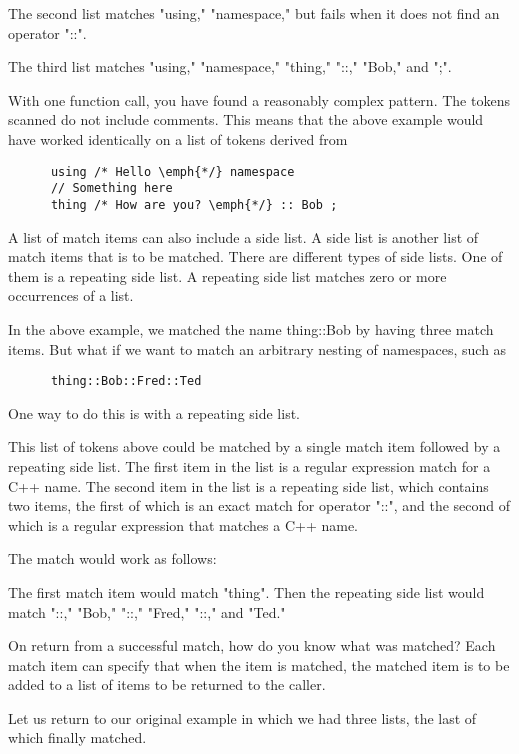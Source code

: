 The second list matches "using," "namespace," but fails when it does not find
an operator "::".

The third list matches "using," "namespace," "thing," "::," "Bob," and ";".

With one function call, you have found a reasonably complex pattern.  The
tokens scanned do not include comments.  This means that the above example
would have worked identically on a list of tokens derived from

\small{\begin{verbatim}
      using /* Hello \emph{*/} namespace
      // Something here
      thing /* How are you? \emph{*/} :: Bob ;
\end{verbatim}}

A list of match items can also include a side list.  A side list is another
list of match items that is to be matched.  There are different types of side
lists.  One of them is a repeating side list.  A repeating side list matches
zero or more occurrences of a list.

In the above example, we matched the name thing::Bob by having three match
items.  But what if we want to match an arbitrary nesting of namespaces, such
as

\small{\begin{verbatim}
      thing::Bob::Fred::Ted
\end{verbatim}}

One way to do this is with a repeating side list.

This list of tokens above could be matched by a single match item followed by
a repeating side list.  The first item in the list is a regular expression
match for a C++ name.  The second item in the list is a repeating side list,
which contains two items, the first of which is an exact match for operator
"::", and the second of which is a regular expression that matches a C++
name.

The match would work as follows:

The first match item would match "thing".  Then the repeating side list would
match "::," "Bob," "::," "Fred," "::," and "Ted."

On return from a successful match, how do you know what was matched?  Each
match item can specify that when the item is matched, the matched item is to
be added to a list of items to be returned to the caller.

Let us return to our original example in which we had three lists, the last
of which finally matched.

